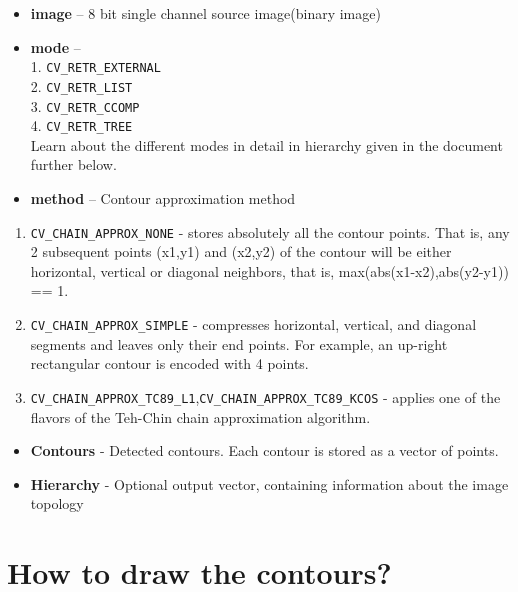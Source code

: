 \documentclass[]{article}
\providecommand{\tightlist}{%
  \setlength{\itemsep}{0pt}\setlength{\parskip}{0pt}}
\begin{document}
\begin{itemize}
\tightlist
\item
  \textbf{image} -- 8 bit single channel source image(binary image)\\
\item
  \textbf{mode} --\\
   1. \texttt{CV\_RETR\_EXTERNAL}\\
   2. \texttt{CV\_RETR\_LIST}\\
   3. \texttt{CV\_RETR\_CCOMP}\\
   4. \texttt{CV\_RETR\_TREE}\\
  Learn about the different modes in detail in hierarchy given in the
  document further below.\\
\item
  \textbf{method} -- Contour approximation method\\
\end{itemize}

\begin{enumerate}
\def\labelenumi{\arabic{enumi}.}
\tightlist
\item
  \texttt{CV\_CHAIN\_APPROX\_NONE} - stores absolutely all the contour
  points. That is, any 2 subsequent points (x1,y1) and (x2,y2) of the
  contour will be either horizontal, vertical or diagonal neighbors,
  that is, max(abs(x1-x2),abs(y2-y1)) == 1.\\
\item
  \texttt{CV\_CHAIN\_APPROX\_SIMPLE} - compresses horizontal, vertical,
  and diagonal segments and leaves only their end points. For example,
  an up-right rectangular contour is encoded with 4 points.\\
\item
  \texttt{CV\_CHAIN\_APPROX\_TC89\_L1},\texttt{CV\_CHAIN\_APPROX\_TC89\_KCOS}
  - applies one of the flavors of the Teh-Chin chain approximation
  algorithm.\\
\end{enumerate}

\begin{itemize}
\tightlist
\item
  \textbf{Contours} - Detected contours. Each contour is stored as a
  vector of points.\\
\item
  \textbf{Hierarchy} - Optional output vector, containing information
  about the image topology
\end{itemize}

\section{How to draw the contours?}\label{how-to-draw-the-contours}
\end{document}
